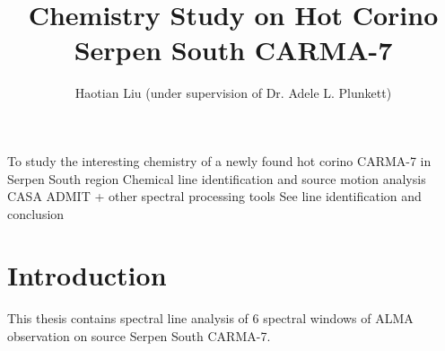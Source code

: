 \documentclass{aa}
\begin{document}
 


   \title{Chemistry Study on Hot Corino Serpen South CARMA-7}



   \author{Haotian Liu (under supervision of Dr. Adele L. Plunkett)}





 
  \abstract
   {To study the interesting chemistry of a newly found hot corino CARMA-7 in Serpen South region}
   {Chemical line identification and source motion analysis}
   {CASA ADMIT + other spectral processing tools}
   {See line identification and conclusion}
   {}


   \maketitle
%

\section{Introduction}

    This thesis contains spectral line analysis of 6 spectral windows of ALMA observation on source Serpen South CARMA-7.

\end{document}
